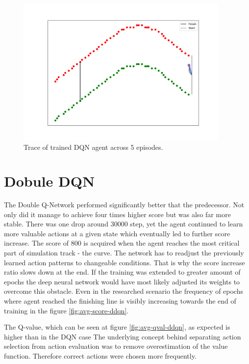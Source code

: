 \begin{figure}[h]
    \centering
    \includegraphics[width=10.5cm]{img/trace_dqn.png}
    \caption{Trace of trained DQN agent across 5 episodes.}
    \label{fig:trace-dqn}
\end{figure}

\newpage

\section{Dobule DQN}
\label{sec:results-double-dqn}

The Double Q-Network performed significantly better that the predecessor. Not only did it manage to achieve four times higher score but
was also far more stable. There was one drop around 30000 step, yet the agent continued to learn more valuable actions at a given state
which eventually led to further score increase. The score of 800 is acquired when the agent reaches the most critical part of
simulation track - the curve. The network has to readjust the previously learned action patterns to changeable conditions. That is why
the score increase ratio slows down at the end. If the training was extended to greater amount of epochs the deep neural network would
have most likely adjusted its weights to overcome this obstacle. Even in the researched scenario the frequency of epochs where agent reached the
finishing line is visibly increasing towards the end of training in the figure \ref{fig:avg-score-ddqn}.

The Q-value, which can be seen at figure \ref{fig:avg-qval-ddqn}, as expected is higher than in the DQN case The underlying concept behind separating action selection from action evaluation
was to remove overestimation of the value function. Therefore correct actions were chosen more frequently.

